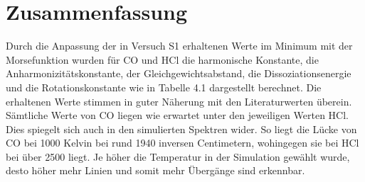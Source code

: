 
 
%
\section{Zusammenfassung}
Durch die Anpassung der in Versuch S1 erhaltenen Werte im Minimum mit der Morsefunktion wurden für CO und HCl die harmonische Konstante, die Anharmonizitätskonstante, der Gleichgewichtsabstand, die Dissoziationsenergie und die Rotationskonstante wie in Tabelle 4.1 dargestellt berechnet. Die erhaltenen Werte stimmen in guter Näherung mit den Literaturwerten überein. Sämtliche Werte von CO liegen wie erwartet unter den jeweiligen Werten HCl. Dies spiegelt sich auch in den simulierten Spektren wider. So liegt die Lücke von CO bei 1000 Kelvin bei rund 1940 inversen Centimetern, wohingegen sie bei HCl bei über 2500 liegt. Je höher die Temperatur in der Simulation gewählt wurde, desto höher mehr Linien und somit mehr Übergänge sind erkennbar.
%